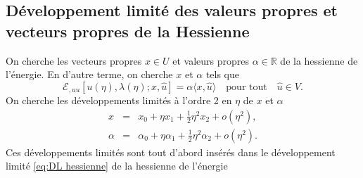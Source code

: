 \documentclass{article}
\newcommand{\nocomma}{}
\begin{document}
\subsection{Développement limité des valeurs propres et vecteurs
propres de la Hessienne}

On cherche les vecteurs propres $x \in U$ et valeurs propres $\alpha \in
\mathbb{R}$ de la hessienne de l'énergie. En d'autre terme, on cherche $x$
et $\alpha$ tels que
\begin{equation}
  \mathcal{E}_{, u \nocomma u} [u (\eta), \lambda (\eta) ; x, \hat{u}] =
  \alpha \langle x, \hat{u} \rangle \quad \text{pour tout} \quad \hat{u} \in
  V.
\end{equation}
On cherche les développements limités à l'ordre 2 en $\eta$ de $x$
et $\alpha$
\begin{eqnarray*}
  x & = & x_0 + \eta x_1 + \tfrac{1}{2} \eta^2 x_2 + o (\eta^2),\\
  \alpha & = & \alpha_0 + \eta \alpha_1 + \tfrac{1}{2} \eta^2 \alpha_2 + o
  (\eta^2) .
\end{eqnarray*}
Ces développements limités sont tout d'abord insérés dans le
développement limité \eqref{eq:DL hessienne} de la hessienne de
l'énergie
\end{document}
